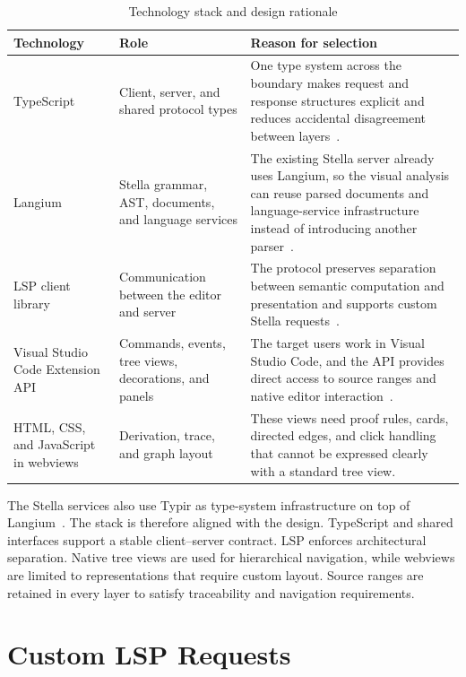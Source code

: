 \begin{table}[htbp]
\centering
\caption{Technology stack and design rationale}
\label{tab:technology-stack}
\begin{tabular}{>{\raggedright\arraybackslash}p{3.8cm}>{\raggedright\arraybackslash}p{4.1cm}>{\raggedright\arraybackslash}p{7.1cm}}
\toprule
\textbf{Technology} & \textbf{Role} & \textbf{Reason for selection} \\
\midrule
TypeScript & Client, server, and shared protocol types & One type system across the boundary makes request and response structures explicit and reduces accidental disagreement between layers~\cite{TypeScriptHandbook}. \\
Langium & Stella grammar, AST, documents, and language services & The existing Stella server already uses Langium, so the visual analysis can reuse parsed documents and language-service infrastructure instead of introducing another parser~\cite{LangiumDocs}. \\
LSP client library & Communication between the editor and server & The protocol preserves separation between semantic computation and presentation and supports custom Stella requests~\cite{MicrosoftLSP,JSONRPC20}. \\
Visual Studio Code Extension API & Commands, events, tree views, decorations, and panels & The target users work in Visual Studio Code, and the API provides direct access to source ranges and native editor interaction~\cite{MicrosoftVS,VSCodeTreeView,VSCodeWebview}. \\
HTML, CSS, and JavaScript in webviews & Derivation, trace, and graph layout & These views need proof rules, cards, directed edges, and click handling that cannot be expressed clearly with a standard tree view. \\
\bottomrule
\end{tabular}
\end{table}

The Stella services also use Typir as type-system infrastructure on top of Langium~\cite{Typir}. The stack is therefore aligned with the design. TypeScript and shared interfaces support a stable client--server contract. LSP enforces architectural separation. Native tree views are used for hierarchical navigation, while webviews are limited to representations that require custom layout. Source ranges are retained in every layer to satisfy traceability and navigation requirements.

\section{Custom LSP Requests}

